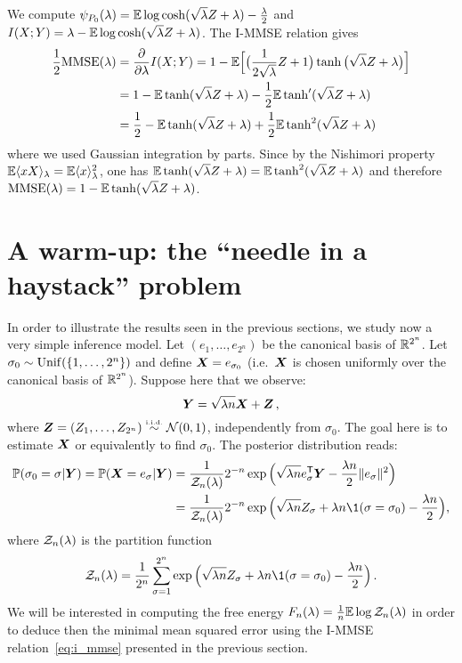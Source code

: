 \documentclass[12pt,nocut]{article}
\begin{document}
\begin{example}[Rademacher prior: $P_0 = \frac{1}{2} \delta_{+1} + \frac{1}{2} \delta_{-1}$] We compute $\psi_{P_0}(\lambda) = \mathbb{E} \log \cosh(\sqrt{\lambda} Z + \lambda)- \frac{\lambda}{2}$ and $I(X;Y) = \lambda - \mathbb{E} \log \cosh(\sqrt{\lambda} Z + \lambda)$. The I-MMSE relation gives
			\begin{align*}
				\frac{1}{2} {{\rm MMSE}}(\lambda) 
				&= \frac{\partial}{\partial \lambda} I(X;Y)
				= 1 - \mathbb{E} \Big[\big(\frac{1}{2\sqrt{\lambda}}Z+1\big) \tanh\big(\sqrt{\lambda}Z + \lambda\big)\Big]
				\\
				&= 1 - \mathbb{E} \tanh(\sqrt{\lambda}Z + \lambda) - \frac{1}{2} \mathbb{E} \tanh'(\sqrt{\lambda}Z + \lambda)
				\\
				&= \frac{1}{2} - \mathbb{E} \tanh(\sqrt{\lambda}Z + \lambda) + \frac{1}{2} \mathbb{E} \tanh^2(\sqrt{\lambda}Z + \lambda)
			\end{align*}
			where we used Gaussian integration by parts. Since by the Nishimori property $\mathbb{E} \langle x X \rangle_{\lambda} = \mathbb{E} \langle x \rangle_{\lambda}^2$, one has $\mathbb{E} \tanh(\sqrt{\lambda}Z + \lambda) = \mathbb{E} \tanh^2(\sqrt{\lambda}Z + \lambda)$ and therefore ${{\rm MMSE}}(\lambda) = 1 - \mathbb{E} \tanh(\sqrt{\lambda}Z + \lambda)$.
\end{example}


\section{A warm-up: the ``needle in a haystack'' problem}\label{sec:rem}

In order to illustrate the results seen in the previous sections, we study now a very simple inference model.
Let $(e_1,\dots,e_{2^n})$ be the canonical basis of $\mathbb{R}^{2^n}$. Let $\sigma_0 \sim {\rm Unif}(\{1,\dots,2^n\})$ and define ${\boldsymbol X} = e_{\sigma_0}$ (i.e.\ ${\boldsymbol X}$ is chosen uniformly over the canonical basis of $\mathbb{R}^{2^n}$).
Suppose here that we observe:
$$
{\boldsymbol Y} = \sqrt{\lambda n} {\boldsymbol X} + {\boldsymbol Z} \,,
$$
where ${\boldsymbol Z} = (Z_1, \dots, Z_{2^n}) \overset{\text{\tiny i.i.d.}}{\sim} \mathcal{N}(0,1)$, independently from $\sigma_0$. The goal here is to estimate ${\boldsymbol X}$ or equivalently to find $\sigma_0$.
The posterior distribution reads:
\begin{align*}
\P(\sigma_0 = \sigma | \bbf{Y}) = 
\P(\bbf{X} = e_{\sigma} | \bbf{Y}) &= 
\frac{1}{\cZ_{n}(\lambda)} 2^{-n} \exp \Big( \sqrt{\lambda n} e_{\sigma}^{\sT} \bbf{Y} - \frac{\lambda n}{2} \|e_{\sigma}\|^2 \Big)
\\
&=
\frac{1}{\cZ_{n}(\lambda)} 2^{-n} \exp \Big( \sqrt{\lambda n}Z_{\sigma} + \lambda n \1(\sigma = \sigma_0) - \frac{\lambda n}{2} \Big) ,
\end{align*}
where $\mathcal{Z}_n(\lambda)$ is the partition function
$$
\cZ_{n}(\lambda) = \frac{1}{2^n} \sum_{\sigma=1}^{2^n} \exp \Big( \sqrt{\lambda n}Z_{\sigma} + \lambda n \1(\sigma = \sigma_0) - \frac{\lambda n}{2} \Big) \,.
$$
We will be interested in computing the free energy $F_n(\lambda) = \frac{1}{n} \mathbb{E} \log \mathcal{Z}_n(\lambda)$ in order to deduce then the minimal mean squared error using the I-MMSE relation~\eqref{eq:i_mmse} presented in the previous section. 
\end{document}
